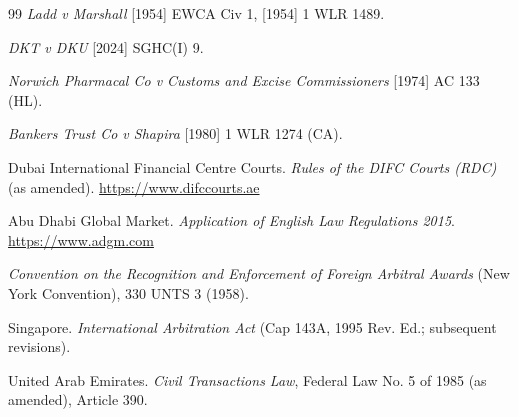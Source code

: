 \documentclass[11pt,letterpaper]{article}
\begin{document}
\begin{thebibliography}{99}
\textit{Ladd v Marshall} [1954] EWCA Civ 1, [1954] 1 WLR 1489.

\textit{DKT v DKU} [2024] SGHC(I) 9.

\textit{Norwich Pharmacal Co v Customs and Excise Commissioners} [1974] AC 133 (HL).

\textit{Bankers Trust Co v Shapira} [1980] 1 WLR 1274 (CA).

Dubai International Financial Centre Courts. \textit{Rules of the DIFC Courts (RDC)} (as amended). \url{https://www.difccourts.ae}

Abu Dhabi Global Market. \textit{Application of English Law Regulations 2015}. \url{https://www.adgm.com}

\textit{Convention on the Recognition and Enforcement of Foreign Arbitral Awards} (New York Convention), 330 UNTS 3 (1958).

Singapore. \textit{International Arbitration Act} (Cap 143A, 1995 Rev. Ed.; subsequent revisions).

United Arab Emirates. \textit{Civil Transactions Law}, Federal Law No. 5 of 1985 (as amended), Article 390.

\end{thebibliography}
\end{document}
